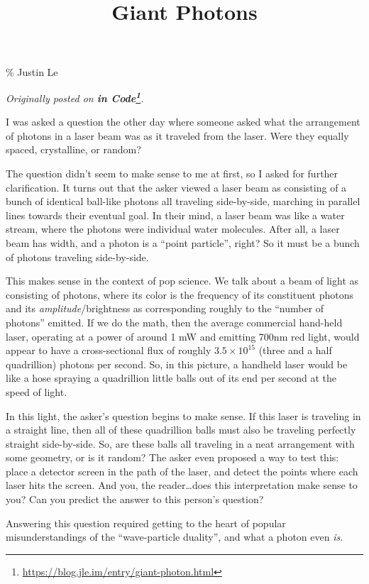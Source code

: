\documentclass[]{article}
\title{Giant Photons}
\renewcommand{\href}[2]{#2\footnote{\url{#1}}}
\begin{document}
\maketitle

\% Justin Le

\emph{Originally posted on
\textbf{\href{https://blog.jle.im/entry/giant-photon.html}{in Code}}.}

I was asked a question the other day where someone asked what the arrangement of
photons in a laser beam was as it traveled from the laser. Were they equally
spaced, crystalline, or random?

The question didn't seem to make sense to me at first, so I asked for further
clarification. It turns out that the asker viewed a laser beam as consisting of
a bunch of identical ball-like photons all traveling side-by-side, marching in
parallel lines towards their eventual goal. In their mind, a laser beam was like
a water stream, where the photons were individual water molecules. After all, a
laser beam has width, and a photon is a ``point particle'', right? So it must be
a bunch of photons traveling side-by-side.

This makes sense in the context of pop science. We talk about a beam of light as
consisting of photons, where its color is the frequency of its constituent
photons and its \emph{amplitude}/brightness as corresponding roughly to the
``number of photons'' emitted. If we do the math, then the average commercial
hand-held laser, operating at a power of around 1 mW and emitting 700nm red
light, would appear to have a cross-sectional flux of roughly
\(3.5 \times 10^{15}\) (three and a half quadrillion) photons per second. So, in
this picture, a handheld laser would be like a hose spraying a quadrillion
little balls out of its end per second at the speed of light.

In this light, the asker's question begins to make sense. If this laser is
traveling in a straight line, then all of these quadrillion balls must also be
traveling perfectly straight side-by-side. So, are these balls all traveling in
a neat arrangement with some geometry, or is it random? The asker even proposed
a way to test this: place a detector screen in the path of the laser, and detect
the points where each laser hits the screen. And you, the reader\ldots does this
interpretation make sense to you? Can you predict the answer to this person's
question?

Answering this question required getting to the heart of popular
misunderstandings of the ``wave-particle duality'', and what a photon even
\emph{is}.
\end{document}
